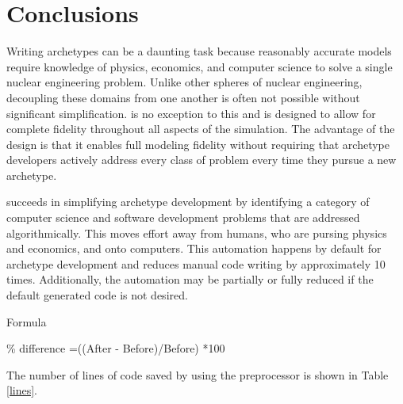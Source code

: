 \section{Conclusions}
\label{sec-conc}

Writing archetypes can be a daunting task because reasonably accurate models 
require knowledge of physics, economics, and computer science to solve a single nuclear engineering 
problem.  Unlike other spheres of nuclear engineering, decoupling these domains from
one another is often not possible without significant simplification. \cyclus is 
no exception to this and is designed to allow for complete fidelity throughout 
all aspects of the simulation. The advantage of the \cyclus design is that it 
enables full modeling fidelity without requiring that archetype developers actively 
address every class of problem every time they pursue a new archetype.

\Cyclus succeeds in simplifying archetype development by identifying a category 
of computer science and software development problems that are addressed 
algorithmically. This moves effort away from humans, who are pursing physics and
economics, and onto computers. This automation happens by default for
archetype development and reduces manual code writing by approximately
10 times.
Additionally, the automation may be partially or fully reduced 
if the default generated code is not desired.

Formula
 
\% difference =((After - Before)/Before) *100
 
The number of lines of code saved by using the preprocessor is shown in Table
\ref{lines}.

